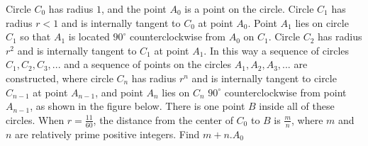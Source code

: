 Circle $C_0$ has radius $1$,  and the point $A_0$ is a point on the circle. Circle $C_1$ has radius $r<1$ and is internally tangent to $C_0$ at point $A_0$. Point $A_1$ lies on circle $C_1$ so that $A_1$ is located $90^{\circ}$ counterclockwise from $A_0$ on $C_1$. Circle $C_2$ has radius $r^2$ and is internally tangent to $C_1$ at point $A_1$. In this way a sequence of circles $C_1,C_2,C_3,...$ and a sequence of points on the circles $A_1,A_2,A_3,...$ are constructed, where circle $C_n$ has radius $r^n$ and is internally tangent to circle $C_{n-1}$ at point $A_{n-1}$,  and point $A_n$ lies on $C_n$ $90^{\circ}$ counterclockwise from point $A_{n-1}$,  as shown in the figure below. There is one point $B$ inside all of these circles. When $r=\frac{11}{60}$,  the distance from the center of $C_0$ to $B$ is $\frac{m}{n}$,  where $m$ and $n$ are relatively prime positive integers. Find $m+n$.$A_0$
